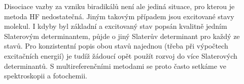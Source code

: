 Disociace vazby za vzniku biradikálů není ale jediná situace, pro kterou je metoda HF nedostatečná. Jiným takovým případem jsou excitované stavy molekul. I kdyby byl základní a excitovaný stav popsán kvalitně jedním Slaterovým determinantem, půjde o jiný Slaterův determinant pro každý ze stavů. Pro konzistentní popis obou stavů najednou (třeba při výpočtech excitačních energií) je tudíž žádoucí opět použít rozvoj do více Slaterových determinantů. S multireferenčními metodami se proto často setkáme ve spektroskopii a fotochemii. 

